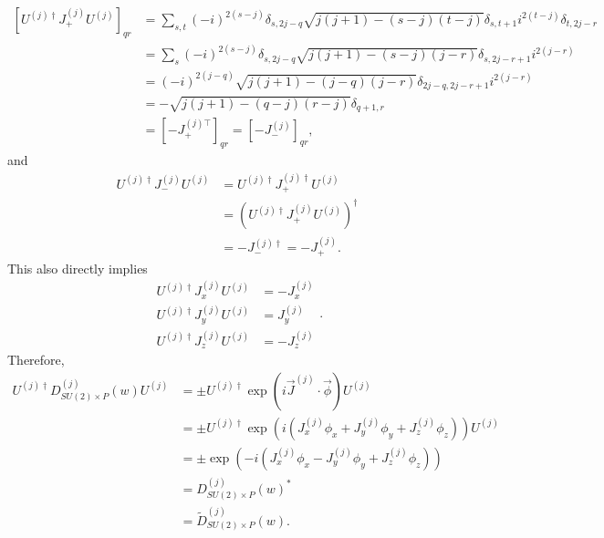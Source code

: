 \documentclass[preprint, 12pt]{revtex4-2}
\numberwithin{equation}{section}
\begin{document}
\begin{equation}
    \begin{aligned}
        \left[U^{(j)\dagger}J_+^{(j)}U^{(j)}\right]_{qr} &= \sum_{s,t}(-i)^{2(s-j)}\delta_{s,2j-q}\sqrt{j(j+1)-(s-j)(t-j)}\delta_{s,t+1}i^{2(t-j)}\delta_{t,2j-r} \\
        &= \sum_{s}(-i)^{2(s-j)}\delta_{s,2j-q}\sqrt{j(j+1)-(s-j)(j-r)}\delta_{s,2j-r+1}i^{2(j-r)} \\
        &= (-i)^{2(j-q)}\sqrt{j(j+1)-(j-q)(j-r)}\delta_{2j-q,2j-r+1}i^{2(j-r)} \\
        &= -\sqrt{j(j+1)-(q-j)(r-j)}\delta_{q+1,r} \\
        &= \left[-J_+^{(j)\top}\right]_{qr} = \left[-J_-^{(j)}\right]_{qr},
    \end{aligned}
\end{equation}
and
\begin{equation}
    \begin{aligned}
        U^{(j)\dagger}J_-^{(j)}U^{(j)} &= U^{(j)\dagger}J_+^{(j)\dagger}U^{(j)} \\
        &= \left(U^{(j)\dagger}J_+^{(j)}U^{(j)}\right)^\dagger \\
        &= -J_-^{(j)\dagger} = -J_+^{(j)}.
    \end{aligned}
\end{equation}
This also directly implies
\begin{equation}
    \begin{aligned}
        U^{(j)\dagger}J_x^{(j)}U^{(j)} &= -J_x^{(j)} \\
        U^{(j)\dagger}J_y^{(j)}U^{(j)} &= J_y^{(j)} \\
        U^{(j)\dagger}J_z^{(j)}U^{(j)} &= -J_z^{(j)}
    \end{aligned}.
\end{equation}
Therefore,
\begin{equation}
    \begin{aligned}
        U^{(j)\dagger}D^{(j)}_{SU(2)\times P}(w)U^{(j)} &= \pm U^{(j)\dagger}\exp(i\vec{J}^{(j)}\cdot\vec{\phi})U^{(j)} \\ 
        &= \pm U^{(j)\dagger}\exp(i(J_x^{(j)}\phi_x+J_y^{(j)}\phi_y+J_z^{(j)}\phi_z))U^{(j)} \\
        &= \pm\exp(-i(J_x^{(j)}\phi_x-J_y^{(j)}\phi_y+J_z^{(j)}\phi_z)) \\
        &= D^{(j)}_{SU(2)\times P}(w)^\ast \\
        &= \tilde{D}^{(j)}_{SU(2)\times P}(w).
    \end{aligned}
\end{equation}
\end{document}
